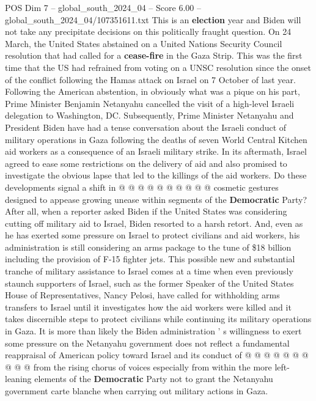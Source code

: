 \begin{textsample}{POS Dim 7 – global\_south\_2024\_04 – Score 6.00 – global\_south\_2024\_04/107351611.txt}  \label{ex:f7_pos_171}
This is an \textbf{election} year and Biden will not take any precipitate decisions on this politically fraught question.
On 24 March, the United States abstained on a United Nations Security Council resolution that had called for a \textbf{cease-fire} in the Gaza Strip.
This was the first time that the US had refrained from voting on a UNSC resolution since the onset of the conflict following the Hamas attack on Israel on 7 October of last year.
Following the American abstention, in obviously what was a pique on his part, Prime Minister Benjamin Netanyahu cancelled the visit of a high-level Israeli delegation to Washington, DC.
Subsequently, Prime Minister Netanyahu and President Biden have had a tense conversation about the Israeli conduct of military operations in Gaza following the deaths of seven World Central Kitchen aid workers as a consequence of an Israeli military strike.
In its aftermath, Israel agreed to ease some restrictions on the delivery of aid and also promised to investigate the obvious lapse that led to the killings of the aid workers.
Do these developments signal a shift in @ @ @ @ @ @ @ @ @ @ cosmetic gestures designed to appease growing unease within segments of the \textbf{Democratic} Party?
After all, when a reporter asked Biden if the United States was considering cutting off military aid to Israel, Biden resorted to a harsh retort.
And, even as he has exerted some pressure on Israel to protect civilians and aid workers, his administration is still considering an arms package to the tune of \$18 billion including the provision of F-15 fighter jets.
This possible new and substantial tranche of military assistance to Israel comes at a time when even previously staunch supporters of Israel, such as the former Speaker of the United States House of Representatives, Nancy Pelosi, have called for withholding arms transfers to Israel until it investigates how the aid workers were killed and it takes discernible steps to protect civilians while continuing its military operations in Gaza.
It is more than likely the Biden administration ' s willingness to exert some pressure on the Netanyahu government does not reflect a fundamental reappraisal of American policy toward Israel and its conduct of @ @ @ @ @ @ @ @ @ @ from the rising chorus of voices especially from within the more left-leaning elements of the \textbf{Democratic} Party not to grant the Netanyahu government carte blanche when carrying out military actions in Gaza.

\end{textsample}
